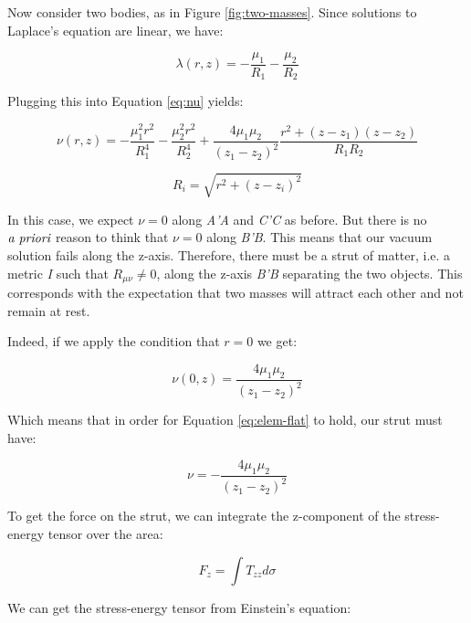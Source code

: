 \documentclass{article}
\begin{document}
Now consider two bodies, as in Figure \ref{fig:two-masses}. Since solutions to Laplace's equation are linear, we have:

\begin{equation}
\lambda (r,z)=-\frac{\mu_{1}}{R_{1}}-\frac{\mu_{2}}{R_{2}}\label{eq:2-m}
\end{equation}

Plugging this into Equation \eqref{eq:nu} yields:

\begin{equation}
\nu (r,z)=-\frac{\mu_{1}^{2}r^{2}}{R_{1}^{4}}-\frac{\mu_{2}^{2}r^{2}}{R_{2}^{4}}+\frac{4\mu_{1}\mu_{2}}{\left(z_{1}-z_{2}\right)^{2}}\frac{r^{2}+\left(z-z_{1}\right)\left(z-z_{2}\right)}{R_{1}R_{2}}
\end{equation}

\begin{equation}
R_{i}=\sqrt{r^{2}+\left(z-z_{i}\right)^{2}}
\end{equation}

In this case, we expect $\nu=0$ along \emph{A'A} and \emph{C'C} as before. But there is no $\emph{a priori}$ reason to think that $\nu=0$ along \emph{B'B}.
This means that our vacuum solution fails along the z-axis. Therefore, there must be a strut of matter, i.e. a metric \emph{I} such that $R_{\mu\nu}\neq 0$, along the z-axis \emph{B'B} separating the two objects. This corresponds with the expectation that two masses will attract each other and not remain at rest.

Indeed, if we apply the condition that $r=0$ we get:

\begin{equation}
\nu (0,z)=\frac{4\mu_{1}\mu_{2}}{\left(z_{1}-z_{2}\right)^{2}}\label{eq:nu_r=0}
\end{equation}

Which means that in order for Equation \eqref{eq:elem-flat} to hold, our strut must have:

\begin{equation}
\nu=-\frac{4\mu_{1}\mu_{2}}{\left(z_{1}-z_{2}\right)^{2}}
\end{equation}

To get the force on the strut, we can integrate the z-component of the stress-energy tensor over the area:

\begin{equation}
F_{z}=\int T_{zz}d\sigma
\end{equation}

We can get the stress-energy tensor from Einstein's equation:
\end{document}
